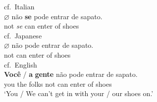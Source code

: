 \documentclass[output=paper]{langsci/langscibook}
\begin{document}
\ea%
    \label{ex:26.44}
    \ea cf.\ Italian\\
    \gll    $\varnothing$\tss{\Genc} não \textbf{se} pode entrar de sapato.\\
            {} not   \emph{se}  can   enter  of shoes\\
    \ex cf.\ Japanese\\
    \gll    $\varnothing$\tss{\Genc} não pode entrar de sapato.\\
            {} not can enter of shoes\\
    \ex cf.\ English\\
    \gll    \textbf{Você} / \textbf{a} \textbf{gente} não pode entrar de sapato.\\
            you {} the folks not can enter of shoes\\
    \glt    ‘You / We can’t get in with your / our shoes on.’
    \z
\z

\end{document}
